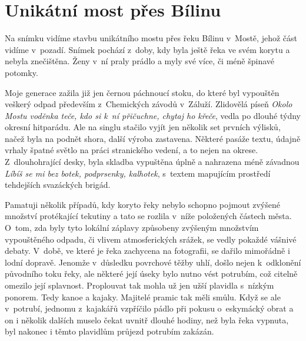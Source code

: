 
\chapter{Unikátní most přes Bílinu}

Na snímku vidíme stavbu unikátního mostu přes řeku Bílinu v~Mostě, jehož část
vidíme v~pozadí. Snímek pochází z~doby, kdy byla ještě řeka ve svém korytu a
nebyla znečištěna. Ženy v~ní praly prádlo a myly své více, či méně špinavé
potomky.

Moje generace zažila již jen černou páchnoucí stoku, do které byl vypouštěn
veškerý odpad především z~Chemických závodů v~Záluží. Zlidovělá píseň {\em
Okolo Mostu voděnka teče, kdo si k~ní přičuchne, chytaj ho křeče}, vedla po
dlouhé týdny okresní hitparádu. Ale na singlu stačilo vyjít jen několik set
prvních výlisků, načež byla na podnět shora, další výroba zastavena. Některé
pasáže textu, údajně vrhaly špatné světlo na práci stranického vedení, a to
nejen na okrese. Z~dlouhohrající desky, byla skladba vypuštěna úplně a
nahrazena méně závadnou {\em Líbíš se mi bez botek, podprsenky, kalhotek},
s~textem mapujícím prostředí tehdejších svazáckých brigád.

Pamatuji několik případů, kdy koryto řeky nebylo schopno pojmout zvýšené
množství protékající tekutiny a tato se rozlila v~níže položených částech
města. O~tom, zda byly tyto lokální záplavy způsobeny zvýšeným množstvím
vypouštěného odpadu, či vlivem atmosferických srážek, se vedly pokaždé vášnivé
debaty. V~době, ve které je řeka zachycena na fotografii, se dařilo mimořádně i
lodní dopravě. Jenomže v~důsledku povrchové těžby uhlí, došlo nejen k~odklonění
původního toku řeky, ale některé její úseky bylo nutno vést potrubím, což
citelně omezilo její splavnost. Proplouvat tak mohla už jen užší plavidla
s~nízkým ponorem. Tedy kanoe a kajaky. Majitelé pramic tak měli smůlu. Když se
ale v~potrubí, jednomu z~kajakářů vzpříčilo pádlo při pokusu o~eskymácký obrat
a on i několik dalších muselo čekat uvnitř dlouhé hodiny, než byla řeka
vypnuta, byl nakonec i těmto plavidlům průjezd potrubím zakázán.

